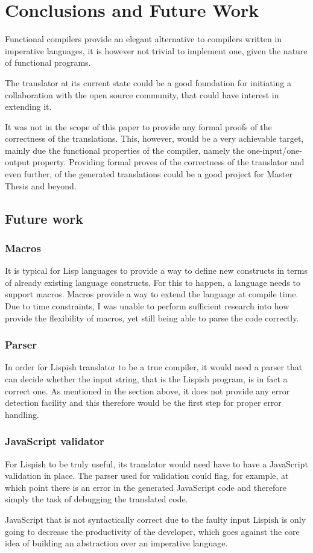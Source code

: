 \chapter{Conclusions and Future Work}

Functional compilers provide an elegant alternative to compilers written in imperative languages, it is however not trivial to implement one, given the nature of functional programs.   

The translator at its current state could be a good foundation for initiating a collaboration with the open source community, that could have interest in extending it. 

It was not in the scope of this paper to provide any formal proofs of the correctness of the translations. This, however, would be a very achievable target, mainly due the functional properties of the compiler, namely the one-input/one-output property. 
Providing formal proves of the correctness of the translator and even further, of the generated translations could be a good project for Master Thesis and beyond. 

\section{Future work}
\subsection{Macros}
It is typical for Lisp languages to provide a way to define new constructs in terms of already existing language constructs.
For this to happen, a language needs to support macros. 
Macros provide a way to extend the language at compile time. 
Due to time constraints, I was unable to perform sufficient research into how provide the flexibility of macros, yet still being able to parse the code correctly. 

\subsection{Parser}
In order for Lispish translator to be a true compiler, it would need a parser that can decide whether the input string, that is the Lispish program, is in fact a correct one. As mentioned in the section above, it does not provide any error detection facility and this therefore would be the first step for proper error handling. 
\subsection{JavaScript validator}
For Lispish to be truly useful, its translator would need have to have a JavaScript validation in place. The parser used for validation could flag, for example, at which point there is an error in the generated JavaScript code and therefore simply the task of debugging the translated code. 

JavaScript that is not syntactically correct due to the faulty input Lispish is only going to decrease the productivity of the developer, which goes against the core idea of building an abstraction over an imperative language.